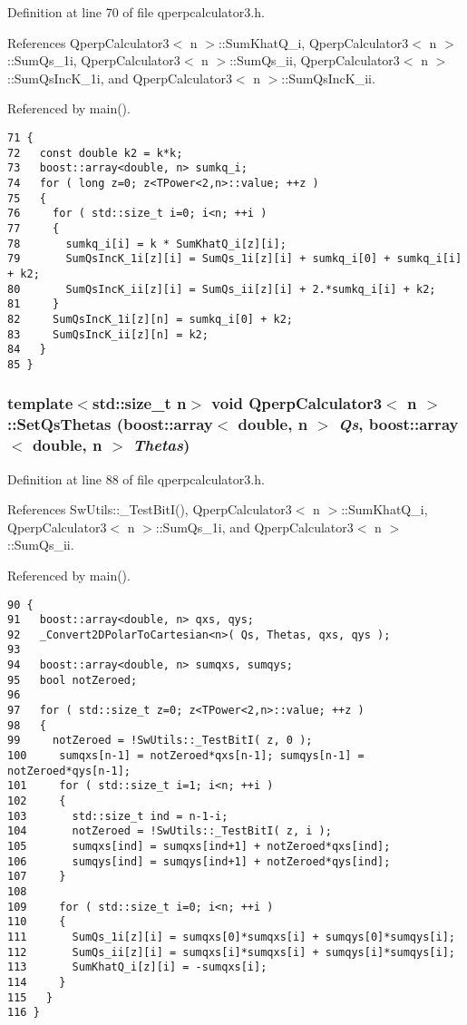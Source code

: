 Definition at line 70 of file qperpcalculator3.h.

References QperpCalculator3$<$ n $>$::SumKhatQ\_\-i, QperpCalculator3$<$ n $>$::SumQs\_\-1i, QperpCalculator3$<$ n $>$::SumQs\_\-ii, QperpCalculator3$<$ n $>$::SumQsIncK\_\-1i, and QperpCalculator3$<$ n $>$::SumQsIncK\_\-ii.

Referenced by main().

\begin{Code}\begin{verbatim}71 {
72   const double k2 = k*k;
73   boost::array<double, n> sumkq_i;
74   for ( long z=0; z<TPower<2,n>::value; ++z )
75   {
76     for ( std::size_t i=0; i<n; ++i )
77     {
78       sumkq_i[i] = k * SumKhatQ_i[z][i];
79       SumQsIncK_1i[z][i] = SumQs_1i[z][i] + sumkq_i[0] + sumkq_i[i] + k2;
80       SumQsIncK_ii[z][i] = SumQs_ii[z][i] + 2.*sumkq_i[i] + k2;
81     }
82     SumQsIncK_1i[z][n] = sumkq_i[0] + k2;
83     SumQsIncK_ii[z][n] = k2;
84   }
85 }
\end{verbatim}
\end{Code}


\subsubsection{\setlength{\rightskip}{0pt plus 5cm}template$<$std::size\_\-t n$>$ void {\bf QperpCalculator3}$<$ n $>$::SetQsThetas (boost::array$<$ double, n $>$ {\em Qs}, boost::array$<$ double, n $>$ {\em Thetas})\hspace{0.3cm}{\tt  [inline]}}\label{classQperpCalculator3_43a309356a17d0afc9346e34dc217cfe}




Definition at line 88 of file qperpcalculator3.h.

References SwUtils::\_\-TestBitI(), QperpCalculator3$<$ n $>$::SumKhatQ\_\-i, QperpCalculator3$<$ n $>$::SumQs\_\-1i, and QperpCalculator3$<$ n $>$::SumQs\_\-ii.

Referenced by main().

\begin{Code}\begin{verbatim}90 {
91   boost::array<double, n> qxs, qys;
92   _Convert2DPolarToCartesian<n>( Qs, Thetas, qxs, qys );
93 
94   boost::array<double, n> sumqxs, sumqys;
95   bool notZeroed;
96 
97   for ( std::size_t z=0; z<TPower<2,n>::value; ++z )
98   {
99     notZeroed = !SwUtils::_TestBitI( z, 0 );
100     sumqxs[n-1] = notZeroed*qxs[n-1]; sumqys[n-1] = notZeroed*qys[n-1];
101     for ( std::size_t i=1; i<n; ++i )
102     {
103       std::size_t ind = n-1-i;
104       notZeroed = !SwUtils::_TestBitI( z, i );
105       sumqxs[ind] = sumqxs[ind+1] + notZeroed*qxs[ind];
106       sumqys[ind] = sumqys[ind+1] + notZeroed*qys[ind];
107     }
108 
109     for ( std::size_t i=0; i<n; ++i )
110     {
111       SumQs_1i[z][i] = sumqxs[0]*sumqxs[i] + sumqys[0]*sumqys[i];
112       SumQs_ii[z][i] = sumqxs[i]*sumqxs[i] + sumqys[i]*sumqys[i];
113       SumKhatQ_i[z][i] = -sumqxs[i];
114     }
115   }
116 }
\end{verbatim}
\end{Code}


